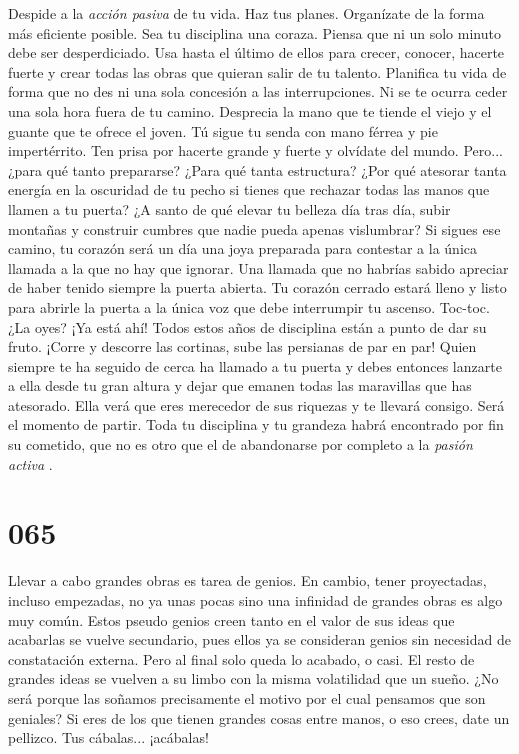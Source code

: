 \documentclass[a4paper,11pt,openright,twocolumn]{book}
\begin{document}
Despide a la {\it acción pasiva}   de tu vida. Haz tus planes. Organízate de la forma más eficiente posible. Sea tu disciplina una coraza. Piensa que ni un solo minuto debe ser desperdiciado. Usa hasta el último de ellos para crecer, conocer, hacerte fuerte y crear todas las obras que quieran salir de tu talento. Planifica tu vida de forma que no des ni una sola concesión a las interrupciones. Ni se te ocurra ceder una sola hora fuera de tu camino. Desprecia la mano que te tiende el viejo y el guante que te ofrece el joven. Tú sigue tu senda con mano férrea y pie impertérrito. Ten prisa por hacerte grande y fuerte y olvídate del mundo. Pero... ¿para qué tanto prepararse? ¿Para qué tanta estructura? ¿Por qué atesorar tanta energía en la oscuridad de tu pecho si tienes que rechazar todas las manos que llamen a tu puerta? ¿A santo de qué elevar tu belleza día tras día, subir montañas y construir cumbres que nadie pueda apenas vislumbrar? Si sigues ese camino, tu corazón será un día una joya preparada para contestar a la única llamada a la que no hay que ignorar. Una llamada que no habrías sabido apreciar de haber tenido siempre la puerta abierta. Tu corazón cerrado estará lleno y listo para abrirle la puerta a la única voz que debe interrumpir tu ascenso. Toc-toc. ¿La oyes? ¡Ya está ahí! Todos estos años de disciplina están a punto de dar su fruto. ¡Corre y descorre las cortinas, sube las persianas de par en par! Quien siempre te ha seguido de cerca ha llamado a tu puerta y debes entonces lanzarte a ella desde tu gran altura y dejar que emanen todas las maravillas que has atesorado. Ella verá que eres merecedor de sus riquezas y te llevará consigo. Será el momento de partir. Toda tu disciplina y tu grandeza habrá encontrado por fin su cometido, que no es otro que el de abandonarse por completo a la {\it pasión activa}  .

\section*{065}

Llevar a cabo grandes obras es tarea de genios. En cambio, tener proyectadas, incluso empezadas, no ya unas pocas sino una infinidad de grandes obras es algo muy común. Estos pseudo genios creen tanto en el valor de sus ideas que acabarlas se vuelve secundario, pues ellos ya se consideran genios sin necesidad de constatación externa. Pero al final solo queda lo acabado, o casi. El resto de grandes ideas se vuelven a su limbo con la misma volatilidad que un sueño. ¿No será porque las soñamos precisamente el motivo por el cual pensamos que son geniales? Si eres de los que tienen grandes cosas entre manos, o eso crees, date un pellizco. Tus cábalas... ¡acábalas!
\end{document}
